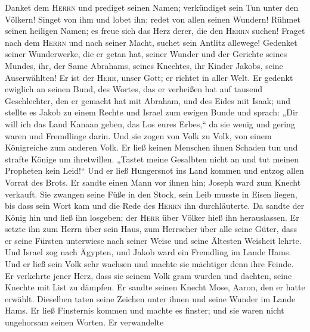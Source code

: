  Danket dem \textsc{Herrn} und prediget seinen Namen;
verkündiget sein Tun unter den Völkern!  Singet von ihm
und lobet ihn; redet von allen seinen Wundern!  Rühmet
seinen heiligen Namen; es freue sich das Herz derer, die den
\textsc{Herrn} suchen!  Fraget nach dem \textsc{Herrn} und
nach seiner Macht, suchet sein Antlitz allewege!  Gedenket
seiner Wunderwerke, die er getan hat, seiner Wunder und der Gerichte
seines Mundes,  ihr, der Same Abrahams, seines Knechtes,
ihr Kinder Jakobs, seine Auserwählten!  Er ist der
\textsc{Herr}, unser Gott; er richtet in aller Welt.  Er
gedenkt ewiglich an seinen Bund, des Wortes, das er verheißen hat auf
tausend Geschlechter,  den er gemacht hat mit Abraham, und
des Eides mit Isaak;  und stellte es Jakob zu einem
Rechte und Israel zum ewigen Bunde  und sprach: „Dir will
ich das Land Kanaan geben, das Los eures Erbes,``  da sie
wenig und gering waren und Fremdlinge darin.  Und sie
zogen von Volk zu Volk, von einem Königreiche zum anderen Volk.
 Er ließ keinen Menschen ihnen Schaden tun und strafte
Könige um ihretwillen.  „Tastet meine Gesalbten nicht an
und tut meinen Propheten kein Leid!{}``  Und er ließ
Hungersnot ins Land kommen und entzog allen Vorrat des Brots.
 Er sandte einen Mann vor ihnen hin; Joseph ward zum
Knecht verkauft.  Sie zwangen seine Füße in den Stock,
sein Leib musste in Eisen liegen,  bis dass sein Wort kam
und die Rede des \textsc{Herrn} ihn durchläuterte.  Da
sandte der König hin und ließ ihn losgeben; der \textsc{Herr} über
Völker hieß ihn herauslassen.  Er setzte ihn zum Herrn
über sein Haus, zum Herrscher über alle seine Güter, 
dass er seine Fürsten unterwiese nach seiner Weise und seine Ältesten
Weisheit lehrte.  Und Israel zog nach Ägypten, und Jakob
ward ein Fremdling im Lande Hams.  Und er ließ sein Volk
sehr wachsen und machte sie mächtiger denn ihre Feinde. 
Er verkehrte jener Herz, dass sie seinem Volk gram wurden und dachten,
seine Knechte mit List zu dämpfen.  Er sandte seinen
Knecht Mose, Aaron, den er hatte erwählt.  Dieselben
taten seine Zeichen unter ihnen und seine Wunder im Lande Hams.
 Er ließ Finsternis kommen und machte es finster; und sie
waren nicht ungehorsam seinen Worten.  Er verwandelte
